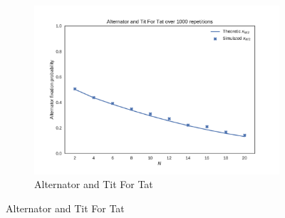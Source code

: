 \documentclass{article}
\begin{document}
\begin{figure}[!hbtp]
\begin{subfigure}[t]{.3\textwidth}
        \centering
        \includegraphics[width=.8\textwidth]{../img/Alternator_v_Tit_For_Tat.pdf}
        \caption{Alternator and Tit For Tat}
    \end{subfigure}%


\end{figure}
\end{document}
